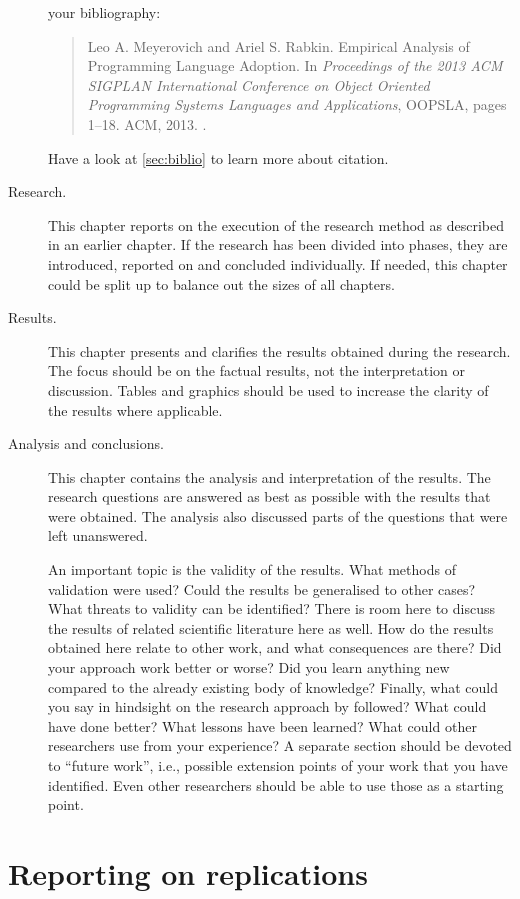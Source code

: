 \documentclass{uvamscse}
\begin{document}
\begin{description}
your bibliography:
\begin{quote}
\cite{MeyerovichR2013} Leo A. Meyerovich and Ariel S. Rabkin. Empirical Analysis of Programming Language Adoption. In \emph{Proceedings of the 2013 ACM SIGPLAN International Conference on Object Oriented Programming Systems Languages and Applications}, OOPSLA, pages 1--18. ACM, 2013. .
\end{quote}
Have a look at \autoref{sec:biblio} to learn more about citation.
  \item[Research.]
  This chapter reports on the execution of the research method as described in
an earlier chapter. If the research has been divided into phases, they are
introduced, reported on and concluded individually. If needed, this chapter
could be split up to balance out the sizes of all chapters.
  \item[Results.]
  This chapter presents and clarifies the results obtained during the
  research. The focus should be on the factual results, not the interpretation
  or discussion. Tables and graphics should be used to increase the clarity of
  the results where applicable.
  \item[Analysis and conclusions.]
  This chapter contains the analysis and interpretation of the results. The
  research questions are answered as best as possible with the results that
  were obtained. The analysis also discussed parts of the questions that were
  left unanswered.

  An important topic is the validity of the results. What methods of
  validation were used? Could the results be generalised to other cases? What
  threats to validity can be identified? There is room here to discuss the
  results of related scientific literature here as well. How do the results
  obtained here relate to other work, and what consequences are there? Did
  your approach work better or worse? Did you learn anything new compared to
  the already existing body of knowledge? Finally, what could you say in
  hindsight on the research approach by followed? What could have done better?
  What lessons have been learned? What could other researchers use from your
  experience? A separate section should be devoted to ``future work'', i.e.,
  possible extension points of your work that you have identified. Even other
  researchers should be able to use those as a starting point.
\end{description}

\section{Reporting on replications}
\end{document}
